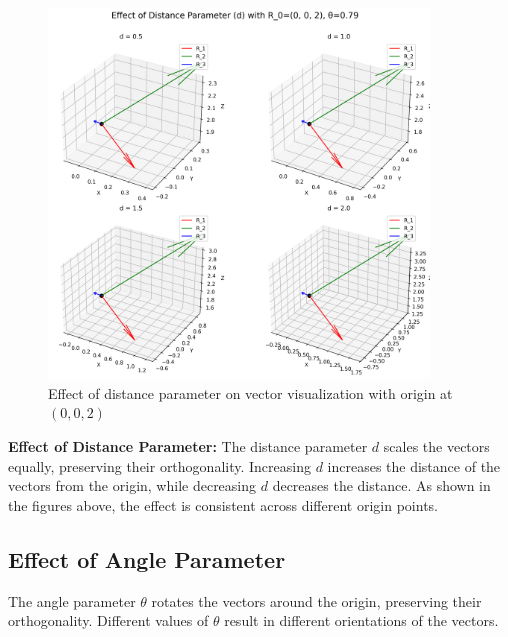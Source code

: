 \begin{figure}[H]
    \centering
    \includegraphics[width=0.9\textwidth]{figures/d_effect_R0_0_0_2.png}
    \caption{Effect of distance parameter on vector visualization with origin at $(0,0,2)$}
    \label{fig:example_distance_effect_custom2}
\end{figure}

\textbf{Effect of Distance Parameter:} The distance parameter $d$ scales the vectors equally, preserving their orthogonality. Increasing $d$ increases the distance of the vectors from the origin, while decreasing $d$ decreases the distance. As shown in the figures above, the effect is consistent across different origin points.

\subsection{Effect of Angle Parameter}

The angle parameter $\theta$ rotates the vectors around the origin, preserving their orthogonality. Different values of $\theta$ result in different orientations of the vectors.

